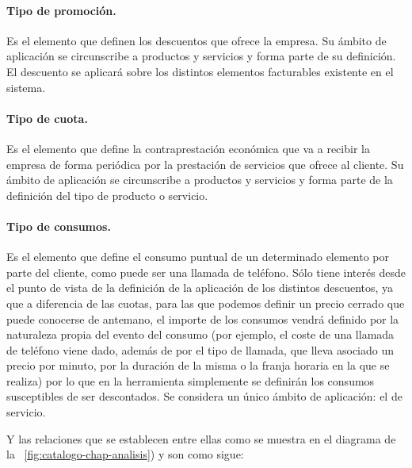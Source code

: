 \paragraph{Tipo de promoción.} Es el elemento que definen los descuentos que ofrece la empresa. Su ámbito de aplicación se circunscribe a productos y servicios y forma parte de su definición. El descuento se aplicará sobre los distintos elementos facturables existente en el sistema.
\paragraph{Tipo de cuota.} Es el elemento que define la contraprestación económica que va a recibir la empresa de forma periódica por la prestación de servicios que ofrece al cliente. Su ámbito de aplicación se circunscribe a productos y servicios y forma parte de la definición del tipo de producto o servicio.
\paragraph{Tipo de consumos.} Es el elemento que define el consumo puntual de un determinado elemento por parte del cliente, como puede ser una llamada de teléfono. Sólo tiene interés desde el punto de vista de la definición de la aplicación de los distintos descuentos, ya que a diferencia de las cuotas, para las que podemos definir un precio cerrado que puede conocerse de antemano, el importe de los consumos vendrá definido por la naturaleza propia del evento del consumo (por ejemplo, el coste de una llamada de teléfono viene dado, además de por el tipo de llamada, que lleva asociado un precio por minuto, por la duración de la misma o la franja horaria en la que se realiza) por lo que en la herramienta simplemente se definirán los consumos susceptibles de ser descontados. Se considera un único ámbito de aplicación: el de servicio.

Y las relaciones que se establecen entre ellas como se muestra en el diagrama de la \figurename~\ref{fig:catalogo-chap-analisis}) y son como sigue:


